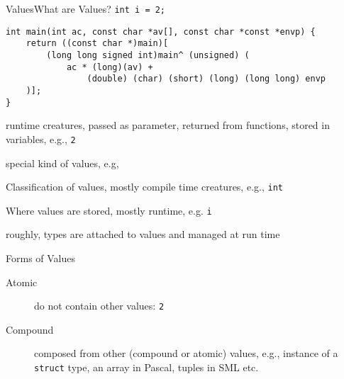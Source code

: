 \documentclass[aspectratio=169]{beamer}
\begin{document}
\begin{frame}[fragile]{Values}{What are Values?}
\texttt{int i = 2;}\\
\begin{verbatim}
int main(int ac, const char *av[], const char *const *envp) {
    return ((const char *)main)[
        (long long signed int)main^ (unsigned) (
            ac * (long)(av) +
                (double) (char) (short) (long) (long long) envp
    )];
}
\end{verbatim}

\begin{description}
    \item [Values] runtime creatures, passed as parameter, returned from functions, stored in variables, e.g., \texttt2
    \item [Function values] special kind of values, e.g,
    \item [Types] Classification of values, mostly compile time creatures, e.g., \texttt{int}
    \item [Variables] Where values are stored, mostly runtime, e.g. \texttt{i}
        \item [Dynamic Typing] roughly, types are attached to values and managed at run time
        \item
\end{description}
\end{frame}

\begin{frame}{Forms of Values}
\begin{description}
    \item [Atomic] do not contain other values: \texttt{2}
    \item [Compound] composed from other (compound or atomic) values, e.g., instance of a \texttt{struct} type, an array in Pascal, tuples in SML etc.
\end{description}
\end{frame}
\end{document}
